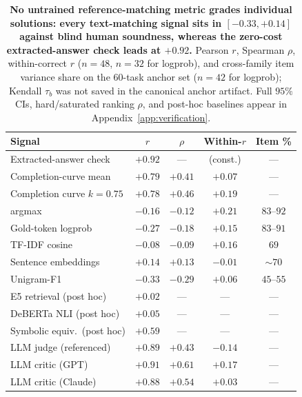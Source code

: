 \begin{table}[t]
\centering
\caption{\textbf{No untrained reference-matching metric grades individual solutions: every text-matching signal sits in $[-0.33, +0.14]$ against blind human soundness, whereas the zero-cost extracted-answer check leads at $+0.92$.} Pearson $r$, Spearman $\rho$, within-correct $r$ ($n{=}48$, $n{=}32$ for logprob), and cross-family item variance share on the $60$-task anchor set ($n{=}42$ for logprob); Kendall $\tau_b$ was not saved in the canonical anchor artifact.
Full $95\%$ CIs, hard/saturated ranking $\rho$, and post-hoc baselines appear in Appendix~\ref{app:verification}.}
\label{tab:class}
\scriptsize
\setlength{\tabcolsep}{1.8pt}
\begin{tabular}{@{}lcccc@{}}
\toprule
Signal & $r$ & $\rho$ & Within-$r$ & Item \% \\
\midrule
Extracted-answer check & $\mathbf{+0.92}$ & --- & (const.) & --- \\
Completion-curve mean & $+0.79$ & $+0.41$ & $+0.07$ & --- \\
Completion curve $k{=}0.75$ & $+0.78$ & $+0.46$ & $+0.19$ & --- \\
\midrule
\tfa{} argmax & $-0.16$ & $-0.12$ & $+0.21$ & $83$--$92$ \\
Gold-token logprob & $-0.27$ & $-0.18$ & $+0.15$ & $83$--$91$ \\
TF-IDF cosine & $-0.08$ & $-0.09$ & $+0.16$ & $69$ \\
Sentence embeddings & $+0.14$ & $+0.13$ & $-0.01$ & $\sim 70$ \\
Unigram-F1 & $-0.33$ & $-0.29$ & $+0.06$ & $45$--$55$ \\
\midrule
E5 retrieval (post hoc) & $+0.02$ & --- & --- & --- \\
DeBERTa NLI (post hoc) & $+0.05$ & --- & --- & --- \\
Symbolic equiv.\ (post hoc) & $+0.59$ & --- & --- & --- \\
\midrule
LLM judge (referenced) & $+0.89$ & $+0.43$ & $-0.14$ & --- \\
LLM critic (GPT) & $+0.91$ & $+0.61$ & $+0.17$ & --- \\
LLM critic (Claude) & $+0.88$ & $+0.54$ & $+0.03$ & --- \\
\bottomrule
\end{tabular}
\end{table}

